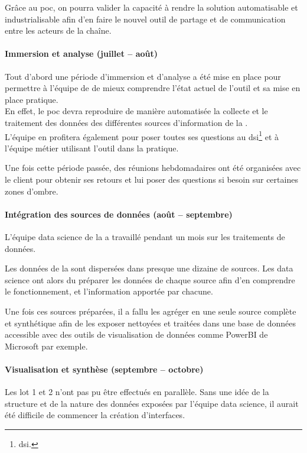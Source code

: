Grâce au \gls{poc}, on pourra valider la capacité à rendre la solution automatisable et industrialisable afin d'en faire le nouvel outil de partage et de communication entre les acteurs de la chaîne.


\paragraph{Immersion et analyse (juillet -- août)}

Tout d'abord une période d'\og immersion et d'analyse \fg a été mise en place pour permettre à l'équipe de \tnp de mieux comprendre l'état actuel de l'outil et sa mise en place pratique.\\
En effet, le \gls{poc} devra reproduire de manière automatisée la collecte et le traitement des données des différentes sources d'information de la \sncf.\\ L'équipe en profitera également pour poser toutes ses questions au
\gls{dsi}\footnote{\glsdesc{dsi}.}
et à l'équipe métier utilisant l'outil dans la pratique.


Une fois cette période passée, des réunions hebdomadaires ont été organisées avec le client pour obtenir ses retours et lui poser des questions si besoin sur certaines zones d'ombre.

\paragraph{Intégration des sources de données (août -- septembre)}

L'équipe data science de la \df a travaillé pendant un mois sur les traitements de données.

Les données de la \sncf sont dispersées dans presque une dizaine de sources. Les data science ont alors du préparer les données de chaque source afin d'en comprendre le fonctionnement, et l'information apportée par chacune.

Une fois ces sources préparées, il a fallu les agréger en une seule source complète et synthétique afin de les exposer nettoyées et traitées dans une base de données accessible avec des outils de visualisation de données comme PowerBI de Microsoft par exemple.

\paragraph{Visualisation et synthèse (septembre -- octobre)}

Les lot 1 et 2 n'ont pas pu être effectués en parallèle. Sans une idée de la structure et de la nature des données exposées par l'équipe data science, il aurait été difficile de commencer la création d'interfaces.

